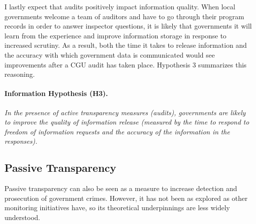 \documentclass[11pt]{article}
\begin{document}
I lastly expect that audits positively impact information quality. When local governments welcome a team of auditors and have to go through their program records in order to answer inspector questions, it is likely that governments it will learn from the experience and improve information storage in response to increased scrutiny. As a result, both the time it takes to release information and the accuracy with which government data is communicated would see improvements after a CGU audit has taken place. Hypothesis 3 summarizes this reasoning.

\paragraph{Information Hypothesis (H3).} \emph{In the presence of active transparency measures (audits), governments are likely to improve the quality of information release (measured by the time to respond to freedom of information requests and the accuracy of the information in the responses).}

\subsection{Passive Transparency} \label{subsec:theory2_paper3}

Passive transparency can also be seen as a measure to increase detection and prosecution of government crimes. However, it has not been as explored as other monitoring initiatives have, so its theoretical underpinnings are less widely understood.
\end{document}

